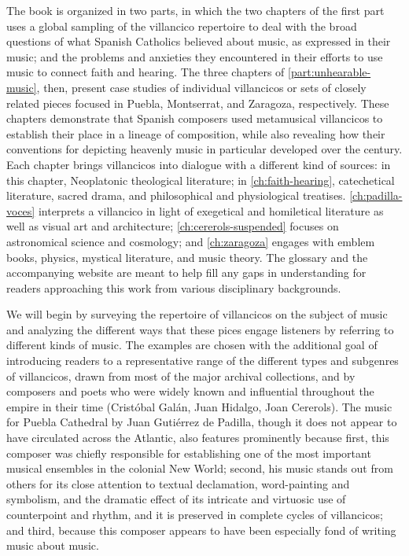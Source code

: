 The book is organized in two parts, in which the two chapters of the first part
uses a global sampling of the villancico repertoire to deal with the broad
questions of what Spanish Catholics believed about music, as expressed in their
music; and the problems and anxieties they encountered in their efforts to use
music to connect faith and hearing.
The three chapters of \cref{part:unhearable-music}, then, present case studies
of individual villancicos or sets of closely related pieces focused in Puebla,
Montserrat, and Zaragoza, respectively.
These chapters demonstrate that Spanish composers used metamusical villancicos
to establish their place in a lineage of composition, while also revealing how
their conventions for depicting heavenly music in particular developed over the
century.
Each chapter brings villancicos into dialogue with a different kind of sources:
in this chapter, Neoplatonic theological literature; in
\cref{ch:faith-hearing}, catechetical literature, sacred drama, and
philosophical and physiological treatises.
\cref{ch:padilla-voces} interprets a villancico in light of exegetical and
homiletical literature as well as visual art and architecture;
\cref{ch:cererols-suspended} focuses on astronomical science and cosmology; and
\cref{ch:zaragoza} engages with emblem books, physics, mystical literature, and
music theory.
The glossary and the accompanying website\XXX{} are meant to help fill any gaps
in understanding for readers approaching this work from various disciplinary
backgrounds.

We will begin by surveying the repertoire of villancicos on the subject of
music and analyzing the different ways that these pices engage listeners by
referring to different kinds of music.
The examples are chosen with the additional goal of introducing readers to a
representative range of the different types and subgenres of villancicos, drawn
from most of the major archival collections, and by composers and poets who
were widely known and influential throughout the empire in their time
(Cristóbal Galán, Juan Hidalgo, Joan Cererols).
The music for Puebla Cathedral by Juan Gutiérrez de Padilla, though it does not
appear to have circulated across the Atlantic, also features prominently
because first, this composer was chiefly responsible for establishing one of
the most important musical ensembles in the colonial New World; second, his
music stands out from others for its close attention to textual declamation,
word-painting and symbolism, and the dramatic effect of its intricate and
virtuosic use of counterpoint and rhythm, and it is preserved in complete
cycles of villancicos; and third, because this composer appears to have
been especially fond of writing music about music.

